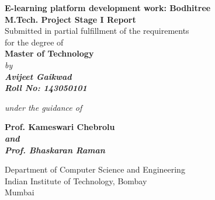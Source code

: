 \documentclass[12pt]{article}
\begin{document}
%
\begin{titlepage}
{\centering     
\large
{\Large\textbf{E-learning platform development work: Bodhitree}}\\
\vspace{1cm}
\textbf{M.Tech. Project Stage I Report}\vspace{1cm} \\
Submitted in partial fulfillment of the requirements\\
for the degree of
\vspace{.5cm} \\
\textbf{Master of Technology}
\vspace{1cm}
\normalsize
\\ \it{by} \\
\vspace{.5cm}
\rm
{\large \textbf{Avijeet Gaikwad}}\\
{\large \textbf {Roll No: 143050101}}

\vspace{1cm}

{\it{under the guidance of}} \\
\vspace{.5cm}

\hspace{.05cm} {\large \bf {Prof. Kameswari Chebrolu} \\ \it{and}  \\ \large \bf {Prof. Bhaskaran Raman}}\\
\vspace {1cm}

\begin{figure}[h] 
{\par}
\end{figure}

Department of Computer Science and Engineering \\ 
Indian Institute of Technology, Bombay\\
{\centering
\hspace{7cm}Mumbai} 
}
\end{titlepage}
\pagebreak
\cleardoublepage
{}

\tableofcontents
\cleardoublepage
{}
\end{document}
